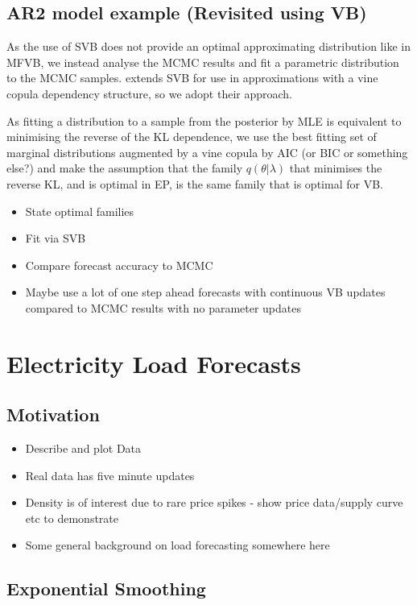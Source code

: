 \documentclass{article}\usepackage[]{graphicx}\usepackage[]{color}
\begin{document}
\subsection{AR2 model example (Revisited using VB)}

As the use of SVB does not provide an optimal approximating distribution like in MFVB, we instead analyse the MCMC results and fit a parametric distribution to the MCMC samples. \citet{Tran2015} extends SVB for use in approximations with a vine copula dependency structure, so we adopt their approach.

As fitting a distribution to a sample from the posterior by MLE is equivalent to minimising the reverse of the KL dependence, we use the best fitting set of marginal distributions augmented by a vine copula by AIC (or BIC or something else?) and make the assumption that the family $q(\theta | \lambda)$ that minimises the reverse KL, and is optimal in EP, is the same family that is optimal for VB.

\begin{itemize}
\item State optimal families
\item Fit via SVB
\item Compare forecast accuracy to MCMC 
\item Maybe use a lot of one step ahead forecasts with continuous VB updates compared to MCMC results with no parameter updates 
\end{itemize}

\section{Electricity Load Forecasts}
\subsection{Motivation}
\begin{itemize}
\item Describe and plot Data
\item Real data has five minute updates
\item Density is of interest due to rare price spikes - show price data/supply curve etc to demonstrate
\item Some general background on load forecasting somewhere here
\end{itemize}

\subsection{Exponential Smoothing}
\end{document}

